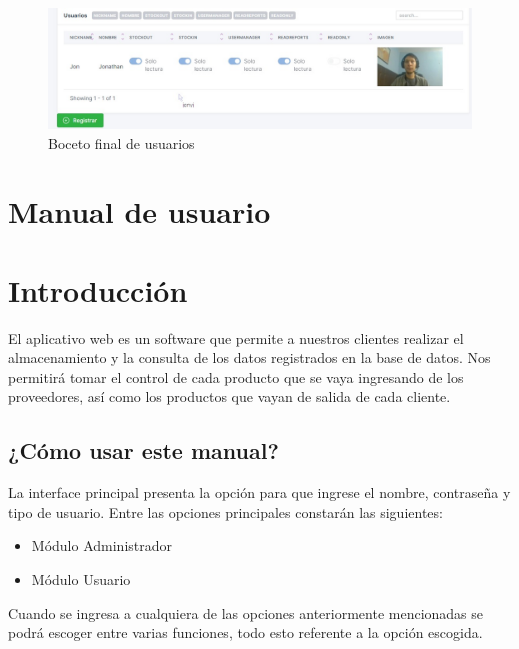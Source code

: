 \documentclass[a4paper,DIV=12]{scrreprt}
\begin{document}
		\begin{figure}[h!]
		\centering
		\includegraphics[scale=0.4]{boceto 3.jpg}
		\caption{Boceto final de usuarios}
		\end{figure}




\newpage
\setcounter{chapter}{9}
\setcounter{section}{-1}
\setcounter{subsection}{-1}
\section{Manual de usuario}
\noindent

\section{Introducción}


 El aplicativo web es un software que permite a nuestros clientes realizar el almacenamiento y la consulta de los datos registrados en la base de datos. Nos permitirá tomar el control de cada producto que se vaya ingresando de los proveedores, así como los productos que vayan de salida de cada cliente.

\subsection{¿Cómo usar este manual?} La interface principal presenta la opción para que ingrese el nombre, contraseña y tipo de usuario. Entre las opciones principales constarán las siguientes: 
 
\begin{itemize}
    \item Módulo Administrador
    \item Módulo Usuario
\end{itemize}

Cuando se ingresa a cualquiera de las opciones anteriormente mencionadas se podrá escoger entre varias funciones, todo esto referente a la opción escogida. 
\end{document}
